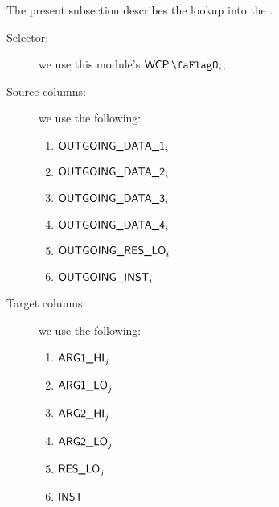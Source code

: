 The present subsection describes the lookup into the \wcpMod{}.
\begin{description}
	\item[Selector:] we use this module's $\wcpFlag{}_{i}$;
	\item[Source columns:] we use the following:
		\begin{multicols}{2}
			\begin{enumerate}
				\item $\textsf{OUTGOING\_DATA\_1}_{i}$
				\item $\textsf{OUTGOING\_DATA\_2}_{i}$
				\item $\textsf{OUTGOING\_DATA\_3}_{i}$
				\item $\textsf{OUTGOING\_DATA\_4}_{i}$
				\item $\textsf{OUTGOING\_RES\_LO}_{i}$
				\item $\textsf{OUTGOING\_INST}_{i}$
			\end{enumerate}
		\end{multicols}
	\item[Target columns:] we use the following:
		\begin{multicols}{2}
			\begin{enumerate}
				\item $\textsf{ARG}\textsf{1}\textsf{\_HI}_{j}$
				\item $\textsf{ARG}\textsf{1}\textsf{\_LO}_{j}$
				\item $\textsf{ARG}\textsf{2}\textsf{\_HI}_{j}$
				\item $\textsf{ARG}\textsf{2}\textsf{\_LO}_{j}$
				\item $\textsf{RES}\textsf{\_LO}_{j}$
				\item $\textsf{INST}$
			\end{enumerate}
		\end{multicols}
\end{description}

